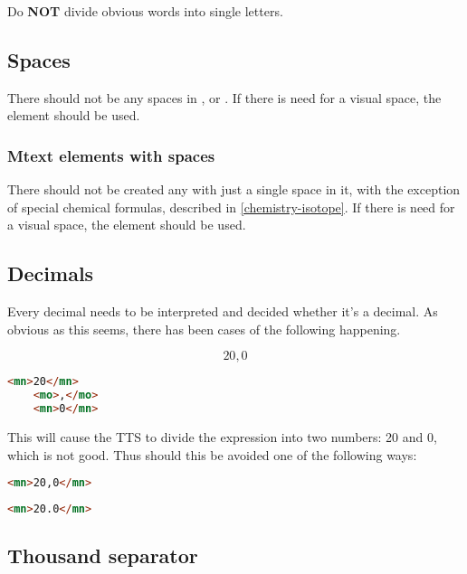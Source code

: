 \documentclass[english,a4paper,11pt]{article}
\begin{document}
Do \textbf{NOT} divide obvious words into single letters.

\subsection{Spaces}

There should not be any spaces in ,  or . If there is need for a visual space, the element  should be used.

\subsubsection{Mtext elements with spaces}

There should not be created any  with just a single space in it, with the exception of special chemical formulas, described in \ref{chemistry-isotope}. If there is need for a visual space, the element  should be used.

\subsection{Decimals}

Every decimal needs to be interpreted and decided whether it's a decimal. As obvious as this seems, there has been cases of the following happening.

\begin{examples}
\begin{equation}
	20,0
\end{equation}
\begin{lstlisting}[language=HTML, caption={\textbf{Invalid markup}}]
	<mn>20</mn>
	<mo>,</mo>
	<mn>0</mn>
\end{lstlisting}

This will cause the TTS to divide the expression into two numbers: 20 and 0, which is not good. Thus should this be avoided one of the following ways:
\begin{lstlisting}[language=HTML, caption={Valid markup 1}]
	<mn>20,0</mn>
\end{lstlisting}
\begin{lstlisting}[language=HTML, caption={Valid markup 2}]
	<mn>20.0</mn>
\end{lstlisting}
\end{examples}

\subsection{Thousand separator}
\end{document}
